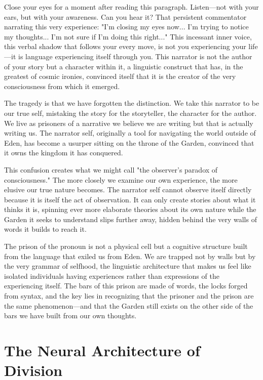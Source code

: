 Close your eyes for a moment after reading this paragraph. Listen—not with your ears, but with your awareness. Can you hear it? That persistent commentator narrating this very experience: "I'm closing my eyes now... I'm trying to notice my thoughts... I'm not sure if I'm doing this right..." This incessant inner voice, this verbal shadow that follows your every move, is not you experiencing your life—it is language experiencing itself through you. This narrator is not the author of your story but a character within it, a linguistic construct that has, in the greatest of cosmic ironies, convinced itself that it is the creator of the very consciousness from which it emerged.

The tragedy is that we have forgotten the distinction. We take this narrator to be our true self, mistaking the story for the storyteller, the character for the author. We live as prisoners of a narrative we believe we are writing but that is actually writing us. The narrator self, originally a tool for navigating the world outside of Eden, has become a usurper sitting on the throne of the Garden, convinced that it owns the kingdom it has conquered.

This confusion creates what we might call "the observer's paradox of consciousness." The more closely we examine our own experience, the more elusive our true nature becomes. The narrator self cannot observe itself directly because it is itself the act of observation. It can only create stories about what it thinks it is, spinning ever more elaborate theories about its own nature while the Garden it seeks to understand slips further away, hidden behind the very walls of words it builds to reach it.

The prison of the pronoun is not a physical cell but a cognitive structure built from the language that exiled us from Eden. We are trapped not by walls but by the very grammar of selfhood, the linguistic architecture that makes us feel like isolated individuals having experiences rather than expressions of the experiencing itself. The bars of this prison are made of words, the locks forged from syntax, and the key lies in recognizing that the prisoner and the prison are the same phenomenon—and that the Garden still exists on the other side of the bars we have built from our own thoughts.

\section{The Neural Architecture of Division}

